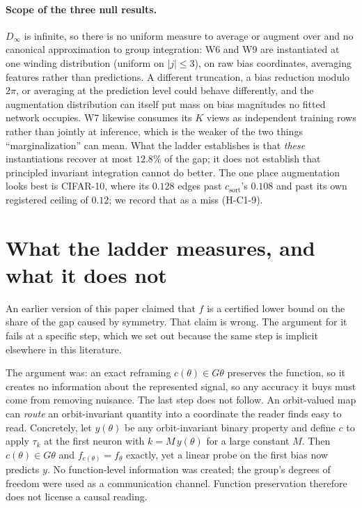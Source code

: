 \documentclass[10pt,letterpaper]{article}
\theoremstyle{definition}
\newcommand{\Dinf}{D_\infty}
\newcommand{\csort}{c_{\mathrm{sort}}}
\begin{document}
\paragraph{Scope of the three null results.} $\Dinf$ is infinite, so there is no uniform measure to
average or augment over and no canonical approximation to group integration: W6 and W9 are
instantiated at one winding distribution (uniform on $|j|\le3$), on raw bias coordinates, averaging
features rather than predictions. A different truncation, a bias reduction modulo $2\pi$, or
averaging at the prediction level could behave differently, and the augmentation distribution can
itself put mass on bias magnitudes no fitted network occupies. W7 likewise consumes its $K$ views as
independent training rows rather than jointly at inference, which is the weaker of the two things
``marginalization'' can mean. What the ladder establishes is that \emph{these} instantiations
recover at most $12.8\%$ of the gap; it does not establish that principled invariant integration
cannot do better. The one place augmentation looks best is CIFAR-10, where its $0.128$ edges past
$\csort$'s $0.108$ and past its own registered ceiling of $0.12$; we record that as a miss (H-C1-9).

\section{What the ladder measures, and what it does not}\label{sec:bounds}

An earlier version of this paper claimed that $f$ is a certified lower bound on the share of the
gap caused by symmetry. That claim is wrong. The argument for it fails at a specific step, which we set out
because the same step is implicit elsewhere in this literature.

The argument was: an exact reframing $c(\theta) \in G\theta$ preserves the function, so it creates
no information about the represented signal, so any accuracy it buys must come from removing
nuisance. The last step does not follow. An orbit-valued map can \emph{route} an orbit-invariant
quantity into a coordinate the reader finds easy to read. Concretely, let $y(\theta)$ be any
orbit-invariant binary property and define $c$ to apply $\tau_{k}$ at the first neuron with
$k = M\,y(\theta)$ for a large constant $M$. Then $c(\theta) \in G\theta$ and
$f_{c(\theta)} = f_\theta$ exactly, yet a linear probe on the first bias now predicts $y$. No
function-level information was created; the group's degrees of freedom were used as a
communication channel. Function preservation therefore does not license a causal reading.
\end{document}
